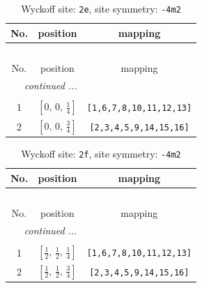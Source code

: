 \documentclass[fleqn,8pt]{jsarticle}
\begin{document}
\begin{longtable}{ccc}
\caption{Wyckoff site: {\tt 2e}, site symmetry: {\tt -4m2}}
 \\
 \hline \hline
No. & position & mapping \\ \hline \endfirsthead

\multicolumn{2}{l}{\tablename\ \thetable{}} \\
 \hline \hline
No. & position & mapping \\ \hline \endhead

 \hline \hline
\multicolumn{2}{r}{\footnotesize\it continued ...} \\ \endfoot

 \hline \hline
\multicolumn{2}{r}{} \\ \endlastfoot

1 & $\left[ 0,\, 0,\, \frac{1}{4} \right]$ & {\tt [1,6,7,8,10,11,12,13]} \\ \hline
2 & $\left[ 0,\, 0,\, \frac{3}{4} \right]$ & {\tt [2,3,4,5,9,14,15,16]} \\
\end{longtable}
\renewcommand{\arraystretch}{1.2}
\begin{longtable}{ccc}
\caption{Wyckoff site: {\tt 2f}, site symmetry: {\tt -4m2}}
 \\
 \hline \hline
No. & position & mapping \\ \hline \endfirsthead

\multicolumn{2}{l}{\tablename\ \thetable{}} \\
 \hline \hline
No. & position & mapping \\ \hline \endhead

 \hline \hline
\multicolumn{2}{r}{\footnotesize\it continued ...} \\ \endfoot

 \hline \hline
\multicolumn{2}{r}{} \\ \endlastfoot

1 & $\left[ \frac{1}{2},\, \frac{1}{2},\, \frac{1}{4} \right]$ & {\tt [1,6,7,8,10,11,12,13]} \\ \hline
2 & $\left[ \frac{1}{2},\, \frac{1}{2},\, \frac{3}{4} \right]$ & {\tt [2,3,4,5,9,14,15,16]} \\
\end{longtable}
\renewcommand{\arraystretch}{1.2}
\end{document}
